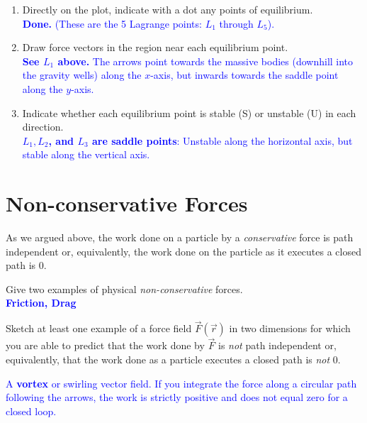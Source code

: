 \documentclass[11pt, letterpaper, openany]{book}
\newenvironment{exercise}[1][Exercise]{%
  \tcolorbox[blanker, breakable, left=1em,
    before skip=1em, after skip=1em,
    borderline west={3pt}{0pt}{PhysNavy},
    colback=PhysCream,
    before upper={\textcolor{PhysNavy}{\sffamily\bfseries #1:}\space}
  ]%
}{%
  \endtcolorbox%
}
\begin{document}
\begin{exercise}[Exercise 4]
\begin{enumerate}
    \item Directly on the plot, indicate with a dot any points of equilibrium. \\
    \textcolor{blue}{\textbf{Done.} (These are the 5 Lagrange points: $L_1$ through $L_5$).}
    \item Draw force vectors in the region near each equilibrium point. \\
    \textcolor{blue}{\textbf{See $L_1$ above.} The arrows point towards the massive bodies (downhill into the gravity wells) along the $x$-axis, but inwards towards the saddle point along the $y$-axis.}
    \item Indicate whether each equilibrium point is stable (S) or unstable (U) in each direction. \\
    \textcolor{blue}{\textbf{$L_1, L_2$, and $L_3$ are saddle points}: Unstable along the horizontal axis, but stable along the vertical axis.}
\end{enumerate}
\end{exercise}

\section*{Non-conservative Forces}

As we argued above, the work done on a particle by a \textit{conservative} force is path independent or, equivalently, the work done on the particle as it executes a closed path is 0.

\begin{exercise}[Exercise 5]
Give two examples of physical \textit{non-conservative} forces. \\
\textcolor{blue}{\textbf{Friction, Drag}}
\end{exercise}

\begin{exercise}[Exercise 6]
Sketch at least one example of a force field $\vec{F}(\vec{r})$ in two dimensions for which you are able to predict that the work done by $\vec{F}$ is \textit{not} path independent or, equivalently, that the work done as a particle executes a closed path is \textit{not} 0.
\begin{center}
\end{center}
\textcolor{blue}{A \textbf{vortex} or swirling vector field. If you integrate the force along a circular path following the arrows, the work is strictly positive and does not equal zero for a closed loop.}
\end{exercise}
\end{document}
